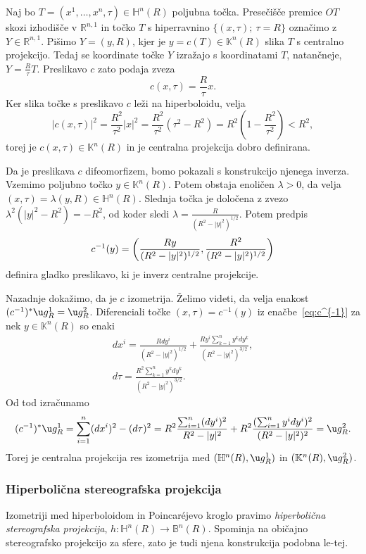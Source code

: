 \documentclass[a4paper]{article}
\begin{document}
Naj bo $T=(x^{1}, \dots , x^{n}, \tau) \in \mathbb{H}^{n}(R)$ poljubna točka. Presečišče premice $OT$ skozi izhodišče v $\mathbb{R}^{n,1}$ in točko $T$ s hiperravnino $\{ (x, \tau); \ \tau=R \}$ označimo z $Y \in \mathbb{R}^{n,1}$. Pišimo $Y=(y,R)$, kjer je $y = c(T) \in \mathbb{K}^{n}(R)$ slika $T$ s centralno projekcijo. 
Tedaj se koordinate točke $Y$ izražajo s koordinatami $T$, natančneje, $Y=\frac{R}{\tau} T$. Preslikavo $c$ zato podaja zveza
\begin{equation}\label{eq: cent-proj}
c(x, \tau) = \frac{R}{\tau} x.
\end{equation}
Ker slika točke s preslikavo $c$ leži na hiperboloidu, velja
\[ |c(x,\tau)|^2 = \frac{R^2}{\tau^2} |x|^2 = \frac{R^2}{\tau^2}(\tau^2-R^2) = R^2 \left(1-\frac{R^2}{\tau^2} \right) < R^2, \]
torej je $c(x, \tau) \in \mathbb{K}^{n}(R)$ in je centralna projekcija dobro definirana.

Da je preslikava $c$ difeomorfizem, bomo pokazali s konstrukcijo njenega inverza.
Vzemimo poljubno točko $y \in \mathbb{K}^{n}(R)$. Potem obstaja enoličen $\lambda>0$, da velja $(x, \tau) = \lambda (y,R) \in \mathbb{H}^{n}(R)$. Slednja točka je določena z zvezo $\lambda^2 (|y|^2-R^2)=-R^2$, od koder sledi $\lambda = \frac{R}{(R^2-|y|^2)^{1/2}}$.
Potem predpis
\begin{equation}\label{eq:c^{-1}}
c^{-1}(y) = \left( \frac{Ry}{(R^2-|y|^2)^{1/2}}, \frac{R^2}{(R^2-|y|^2)^{1/2}} \right)
\end{equation}
definira gladko preslikavo, ki je inverz centralne projekcije.

Nazadnje dokažimo, da je $c$ izometrija. Želimo videti, da velja enakost $(c^{-1})^{*} \u g_{R}^{1} = \u g_{R}^{2}$.
Diferenciali točke $(x, \tau) = c^{-1}(y)$ iz enačbe~\ref{eq:c^{-1}} za nek $y \in \mathbb{K}^{n}(R)$ so enaki
\begin{gather*}
dx^{i} = \frac{Rdy^{i}}{(R^2-|y|^2)^{1/2}} + \frac{Ry^{i} \sum_{k=1}^{n}y^{k}dy^{k}}{(R^2-|y|^2)^{3/2}}, \\
d\tau = \frac{R^2 \sum_{k=1}^{n}y^{k}dy^{k}}{(R^2-|y|^2)^{3/2}}.
\end{gather*}
Od tod izračunamo
\[ (c^{-1})^{*} \u g_{R}^{1} = \sum_{i=1}^{n} (dx^{i})^2 - (d\tau)^2 = R^2 \frac{\sum_{i=1}^{n}(dy^{i})^2}{R^2-|y|^2} + R^2 \frac{(\sum_{i=1}^{n}y^{i}dy^{i})^2}{(R^2-|y|^2)^2} = \u g_{R}^{2}. \]
Torej je centralna projekcija res izometrija med $(\mathbb{H}^{n}(R), \u g_{R}^{1})$ in $(\mathbb{K}^{n}(R), \u g_{R}^{2})$.

\subsubsection{Hiperbolična stereografska projekcija}
Izometriji med hiperboloidom in Poincar\'ejevo kroglo pravimo \emph{hiperbolična stereografska projekcija}, $h \colon \mathbb{H}^{n}(R) \to \mathbb{B}^{n}(R)$. Spominja na običajno stereografsko projekcijo za sfere, zato je tudi njena konstrukcija podobna le-tej.
\end{document}

